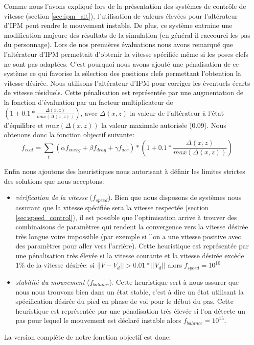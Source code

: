 \documentclass[runningheads,a4paper]{llncs}
\begin{document}
Comme nous l'avons expliqué lors de la présentation des systèmes de contrôle de vitesse (section \ref{sec:ipm_alt}), l'utilisation de valeurs élevées pour l'altérateur d'IPM peut rendre le mouvement instable. De plus, ce système entraine une modification majeure des résultats de la simulation (en général il raccourci les pas du personnage). Lors de nos premières évaluations nous avons remarqué que l'altérateur d'IPM permettait d'obtenir la vitesse spécifiée même si les poses clefs ne sont pas adaptées. C'est pourquoi nous avons ajouté une pénalisation de ce système ce qui favorise la sélection des positions clefs permettant l'obtention la vitesse désirée. Nous utilisons l'altérateur d'IPM pour corriger les éventuels écarts de vitesse résiduels. Cette pénalisation est représentée par une augmentation de la fonction d'évaluation par un facteur multiplicateur de $(1+0.1*\frac{\Delta(x,z)}{max(\Delta(x,z))})$, avec $\Delta(x,z)$ la valeur de l'altérateur à l'état d'équilibre et $max(\Delta(x,z))$ la valeur maximale autorisée (0.09). Nous obtenons donc la fonction objectif suivante:
$$
f_{eval} = \sum_{\substack{t}} (\alpha f_{energ} + \beta f_{drag} + \gamma f_{acc})*(1+0.1*\frac{\Delta(x,z)}{max(\Delta(x,z))}) 
$$

Enfin nous ajoutons des heuristiques nous autorisant à définir les limites strictes des solutions que nous acceptons:
\begin{itemize}
\item{\textit{vérification de la vitesse} ($f_{speed}$). Bien que nous disposons de systèmes nous assurant que la vitesse spécifiée sera la vitesse respectée (section \ref{sec:speed_control}), il est possible que l'optimisation arrive à trouver des combinaisons de paramètres qui rendent la convergence vers la vitesse désirée très longue voire impossible (par exemple si l'on a une vitesse positive avec des paramètres pour aller vers l'arrière). Cette heuristique est représentée par une pénalisation très élevée si la vitesse courante et la vitesse désirée excède 1\% de la vitesse désirée: si $||V-V_d||>0.01*||V_d||$ alors $f_{speed}=10^{10}$}
\item{\textit{stabilité du mouvement} ($f_{balance}$).  Cette heuristique sert à nous assurer que nous nous trouvons bien dans un état stable, c'est à dire un état utilisant la spécification désirée du pied en phase de vol pour le début du pas. Cette heuristique est représentée par une pénalisation très élevée si l'on détecte un pas pour lequel le mouvement est déclaré instable alors $f_{balance}=10^{15}$.  }
\end{itemize}
 La version complète de notre fonction objectif est donc:
\end{document}
